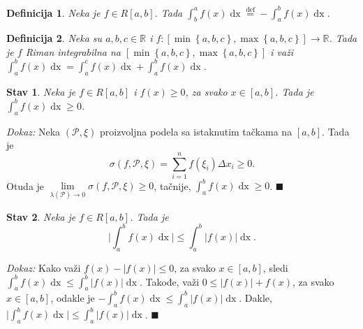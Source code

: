 \documentclass{article}
\newtheorem{definicija}{Definicija}[section]
\newtheorem{stav}{Stav}[section]
\DeclareMathOperator{\dx}{dx}
\begin{document}
\begin{defbox}
    \label{definicija_2.11}
    \begin{definicija}
        Neka je $f \in R\left[a, b\right]$. Tada $\displaystyle\int^a_b f\left(x\right)\dx \overset{\text{def}}{=} -\int^b_a f\left(x\right)\dx$.
    \end{definicija}
\end{defbox}

\begin{defbox}
    \label{definicija_2.12}
    \begin{definicija} Neka su $a, b, c \in \mathbb{R}$ i $f:\left[\min\left\{a, b, c\right\}, \max\left\{a, b, c\right\}\right] \longrightarrow \mathbb{R}$. Tada je
        $f$ Riman integrabilna na $\left[\min\left\{a, b, c\right\}, \max\left\{a, b, c\right\}\right]$ i važi
        $\displaystyle \int^b_a f\left(x\right)\dx = \int^c_a f\left(x\right)\dx + \int^b_a f\left(x\right) \dx$.
    \end{definicija}
\end{defbox}

\begin{stavbox}
    \label{stav_2.8}
    \begin{stav}
        Neka je $f \in R\left[a,b\right]$ i $f\left(x\right) \geq 0$, za svako $x \in \left[a,b\right]$. Tada je $\displaystyle \int^b_a f\left(x\right)\dx \geq 0$.
    \end{stav}
\end{stavbox}

\textit{Dokaz:} Neka $\left(\mathcal{P}, \xi\right)$ proizvoljna podela sa istaknutim tačkama na
$\left[a, b\right]$. Tada je
$$\sigma\left(f, \mathcal{P}, \xi\right) = \displaystyle \sum^n_{i=1}f\left(\xi_i\right)\Delta x_i \geq 0.$$
Otuda je $\displaystyle \lim\limits_{\lambda\left(\mathcal{P}\right)\longrightarrow 0} \sigma \left(f, \mathcal{P}, \xi\right) \geq 0$, tačnije, $\displaystyle \int^b_a f\left(x\right)\dx \geq 0$.
\null\hfill $\blacksquare$\par

\begin{stavbox}
    \label{stav_2.9}
    \begin{stav}
        Neka je $f \in R\left[a, b\right]$. Tada je
        $$\displaystyle \bigg|\int^b_a f\left(x\right)\dx\bigg| \leq \int^b_a\big|f\left(x\right)\big|\dx.$$
    \end{stav}
\end{stavbox}

\textit{Dokaz:} Kako važi $f\left(x\right) - |f\left(x\right)| \leq 0$, za svako $x\in \left[a, b\right]$, sledi $\displaystyle \int^b_a f\left(x\right)\dx \leq \int^b_a |f\left(x\right)|\dx$.
Takođe, važi $0\leq|f\left(x\right)| + f\left(x\right)$, za svako $x\in \left[a, b\right]$, odakle je $\displaystyle -\int^b_a f\left(x\right)\dx \leq \int^b_a |f\left(x\right)|\dx$.
Dakle, $\displaystyle \bigg|\int^b_a f\left(x\right)\dx\bigg| \leq \int^b_a\big|f\left(x\right)\big|\dx$.
\null\hfill $\blacksquare$\par
\end{document}
